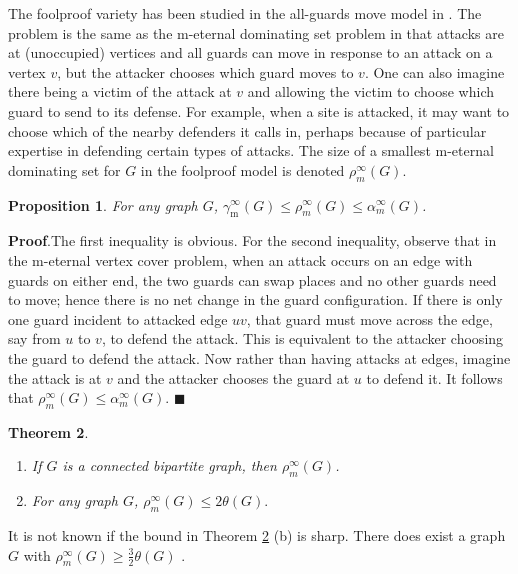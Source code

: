 \documentclass[12pt]{article}%
\newtheorem{theorem}{Theorem}[section]
\newtheorem{proposition}[theorem]{Proposition}
\begin{document}
The foolproof variety has been studied in the all-guards move model in
\cite{kmfool}. The problem is the same as the m-eternal dominating set problem
in that attacks are at (unoccupied) vertices and all guards can move in
response to an attack on a vertex $v$, but the attacker chooses which guard
moves to $v$. One can also imagine there being a victim of the attack at $v$
and allowing the victim to choose which guard to send to its defense. For
example, when a site is attacked, it may want to choose which of the nearby
defenders it calls in, perhaps because of particular expertise in defending
certain types of attacks. The size of a smallest m-eternal dominating set for
$G$ in the foolproof model is denoted $\rho_{m}^{\infty}(G)$.

\begin{proposition}
\emph{\cite{kmfool}\hspace{0.1in}}For any graph $G$, $\gamma_{\mathrm{m}%
}^{\infty}(G)\leq\rho_{m}^{\infty}(G)\leq\alpha_{m}^{\infty}(G)$.
\end{proposition}

\noindent\textbf{Proof}.\hspace{0.1in}The first inequality is obvious. For the
second inequality, observe that in the m-eternal vertex cover problem, when an
attack occurs on an edge with guards on either end, the two guards can swap
places and no other guards need to move; hence there is no net change in the
guard configuration. If there is only one guard incident to attacked edge
$uv$, that guard must move across the edge, say from $u$ to $v$, to defend the
attack. This is equivalent to the attacker choosing the guard to defend the
attack. Now rather than having attacks at edges, imagine the attack is at $v$
and the attacker chooses the guard at $u$ to defend it. It follows that
$\rho_{m}^{\infty}(G)\leq\alpha_{m}^{\infty}(G)$. \hfill$\blacksquare$

\begin{theorem}
\emph{\cite{kmfool}}\label{cliques}

\begin{enumerate}
\item[\emph{(a)}] If $G$ is a connected bipartite graph, then $\rho
_{m}^{\infty}(G)$.

\item[\emph{(b)}] For any graph $G$, $\rho_{m}^{\infty}(G)\leq2\theta(G).$
\end{enumerate}
\end{theorem}

It is not known if the bound in Theorem \ref{cliques} (b) is sharp. There does
exist a graph $G$ with $\rho_{m}^{\infty}(G) \geq\frac{3}{2} \theta(G)$
\cite{kmfool}.
\end{document}
